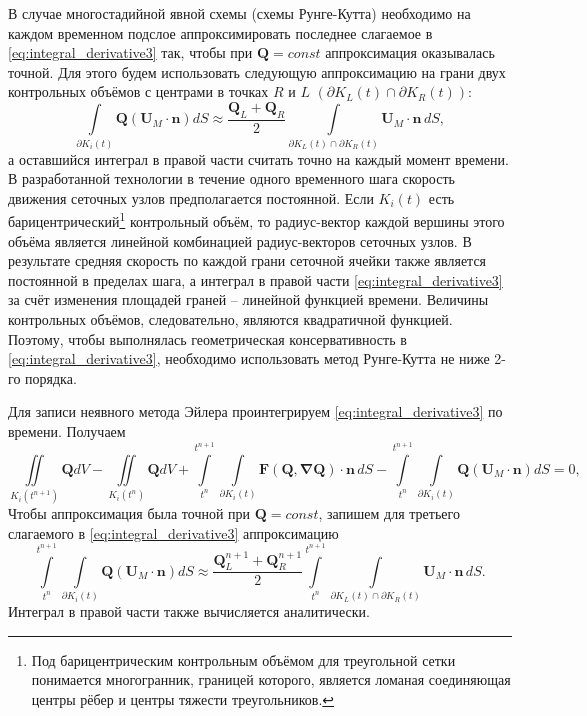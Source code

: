 В случае многостадийной явной схемы (схемы Рунге-Кутта) необходимо на каждом временном подслое аппроксимировать последнее слагаемое в \eqref{eq:integral_derivative3} так, чтобы при $\mathbf{Q} = const$  аппроксимация оказывалась точной. Для этого будем использовать следующую аппроксимацию на грани двух контрольных объёмов с центрами в точках $R$ и $L$ $(\partial K_L(t)\cap\partial K_R(t) )$:
\begin{equation}\label{eq:approx}
\int \limits_{\partial K_i(t)}\mathbf{Q}(\mathbf{U}_M\cdot \mathbf{n})dS \approx \frac{\mathbf{Q}_L + \mathbf{Q}_R}{2} \int \limits_{\partial K_L(t)\cap\partial K_R(t)} \mathbf{U}_M\cdot \mathbf{n}\,dS,
\end{equation}
а оставшийся интеграл в правой части считать точно на каждый момент времени. В разработанной технологии в течение одного временного шага скорость движения сеточных узлов предполагается постоянной. Если $K_i(t)$  есть барицентрический\footnote{Под барицентрическим контрольным объёмом для треугольной сетки понимается многогранник, границей которого, является ломаная соединяющая центры рёбер и центры тяжести треугольников.}  контрольный объём, то радиус-вектор каждой вершины этого объёма является линейной комбинацией радиус-векторов сеточных узлов. В результате средняя скорость по каждой грани сеточной ячейки также является постоянной в пределах шага, а интеграл в правой части \eqref{eq:integral_derivative3} за счёт изменения площадей граней – линейной функцией времени. Величины контрольных объёмов, следовательно, являются квадратичной функцией. Поэтому, чтобы выполнялась геометрическая консервативность в \eqref{eq:integral_derivative3}, необходимо использовать метод Рунге-Кутта не ниже 2-го порядка.

Для записи неявного метода Эйлера проинтегрируем \eqref{eq:integral_derivative3} по времени. Получаем
\begin{equation}\label{eq:integral_time}
\iint \limits_{K_i(t^{n+1})} \mathbf{Q}dV  - \iint \limits_{K_i(t^{n})} \mathbf{Q}dV+ 
\int \limits_{t^n}^{t^{n+1}} \int \limits_{\partial K_i(t)}\mathbf{F(Q, \nabla Q)} \cdot \mathbf{n} \,dS - 
\int \limits_{t^n}^{t^{n+1}} \int \limits_{\partial K_i(t)}\mathbf{Q}(\mathbf{U}_M\cdot \mathbf{n})dS = 0 ,
\end{equation}
Чтобы аппроксимация была точной при  $\mathbf{Q} = const$, запишем для третьего слагаемого в \eqref{eq:integral_derivative3} аппроксимацию
\begin{equation}\label{eq:approx_time}
\int \limits_{t^n}^{t^{n+1}} \int \limits_{\partial K_i(t)}\mathbf{Q}(\mathbf{U}_M\cdot \mathbf{n})dS \approx \frac{\mathbf{Q}^{n+1}_L + \mathbf{Q}^{n+1}_R}{2} \int \limits_{t^n}^{t^{n+1}} \int \limits_{\partial K_L(t)\cap\partial K_R(t)} \mathbf{U}_M\cdot \mathbf{n}\,dS.
\end{equation}
Интеграл в правой части также вычисляется аналитически.

